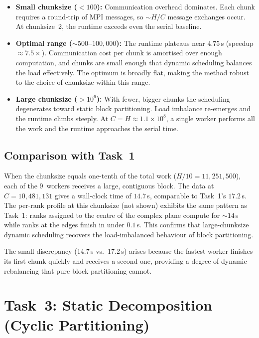 \documentclass[11pt,a4paper]{article}
\begin{document}
\begin{itemize}\itemsep2pt
\item \textbf{Small chunksize ($< 100$):} Communication overhead
    dominates. Each chunk requires a round-trip of MPI messages, so
    $\sim H / C$ message exchanges occur. At chunksize~2, the runtime
    exceeds even the serial baseline.

\item \textbf{Optimal range ($\sim 500$--$100{,}000$):} The runtime
    plateaus near $4.75$\,s (speedup $\approx 7.5\times$).
    Communication cost per chunk is amortised over enough computation,
    and chunks are small enough that dynamic scheduling balances the load
    effectively. The optimum is broadly flat, making the method robust to
    the choice of chunksize within this range.

\item \textbf{Large chunksize ($> 10^6$):} With fewer, bigger chunks the
    scheduling degenerates toward static block partitioning. Load
    imbalance re-emerges and the runtime climbs steeply. At
    $C = H \approx 1.1 \times 10^8$, a single worker performs all the
    work and the runtime approaches the serial time.
\end{itemize}

\subsection{Comparison with Task~1}

When the chunksize equals one-tenth of the total work
($H/10 = 11{,}251{,}500$), each of the 9~workers receives a large,
contiguous block. The data at $C = 10{,}481{,}131$ gives a wall-clock time
of $14.7$\,s, comparable to Task~1's $17.2$\,s. The per-rank profile at
this chunksize (not shown) exhibits the same pattern as Task~1:
ranks assigned to the centre of the complex plane compute for
$\sim 14$\,s while ranks at the edges finish in under $0.1$\,s.
This confirms that large-chunksize dynamic scheduling recovers the
load-imbalanced behaviour of block partitioning.

The small discrepancy (14.7\,s vs.\ 17.2\,s) arises because the fastest
worker finishes its first chunk quickly and receives a second one,
providing a degree of dynamic rebalancing that pure block partitioning
cannot.

\section{Task~3: Static Decomposition (Cyclic Partitioning)}
\label{sec:task3}
\end{document}
